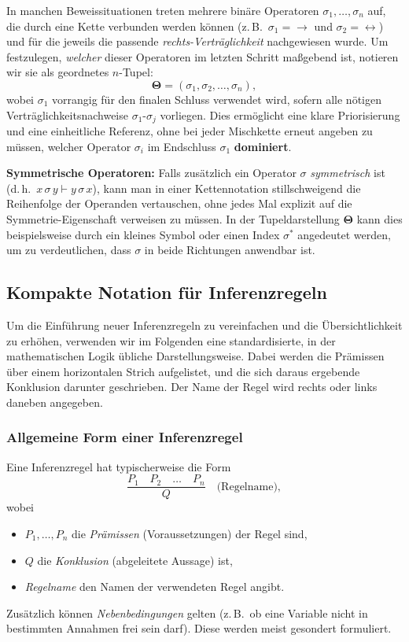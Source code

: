 \documentclass[main.tex]{subfiles}
\begin{document}
\begin{remark}
In manchen Beweissituationen treten mehrere binäre Operatoren \(\sigma_1, \dots, \sigma_n\) auf, die durch eine Kette verbunden werden können (z.\,B.\ \(\sigma_1 = \to\) und \(\sigma_2 = \leftrightarrow\)) und für die jeweils die passende \emph{rechts-Verträglichkeit} nachgewiesen wurde. Um festzulegen, \emph{welcher} dieser Operatoren im letzten Schritt maßgebend ist, notieren wir sie als geordnetes \(n\)-Tupel:
\[
\boldsymbol{\Theta} = (\sigma_1, \sigma_2, \ldots, \sigma_n),
\]
wobei \(\sigma_1\) vorrangig für den finalen Schluss verwendet wird, sofern alle nötigen Verträglichkeitsnachweise \(\sigma_1\)-\(\sigma_j\) vorliegen. Dies ermöglicht eine klare Priorisierung und eine einheitliche Referenz, ohne bei jeder Mischkette erneut angeben zu müssen, welcher Operator \(\sigma_i\) im Endschluss \(\sigma_1\) \textbf{dominiert}.

\smallskip

\textbf{Symmetrische Operatoren:} Falls zusätzlich ein Operator \(\sigma\) \emph{symmetrisch} ist (d.\,h.\ \(x \,\sigma\, y \vdash y \,\sigma\, x\)), kann man in einer Kettennotation stillschweigend die Reihenfolge der Operanden vertauschen, ohne jedes Mal explizit auf die Symmetrie-Eigenschaft verweisen zu müssen. In der Tupeldarstellung \(\boldsymbol{\Theta}\) kann dies beispielsweise durch ein kleines Symbol oder einen Index \(\sigma^*\) angedeutet werden, um zu verdeutlichen, dass \(\sigma\) in beide Richtungen anwendbar ist.
\end{remark}

\subsection{Kompakte Notation für Inferenzregeln}

Um die Einführung neuer Inferenzregeln zu vereinfachen und die Übersichtlichkeit zu erhöhen, verwenden wir im Folgenden eine standardisierte, in der mathematischen Logik übliche Darstellungsweise. Dabei werden die Prämissen über einem horizontalen Strich aufgelistet, und die sich daraus ergebende Konklusion darunter geschrieben. Der Name der Regel wird rechts oder links daneben angegeben. 

\subsubsection{Allgemeine Form einer Inferenzregel}
Eine Inferenzregel hat typischerweise die Form
\[
\frac{P_1 \quad P_2 \quad \dots \quad P_n}{Q}
\quad
\text{(Regelname)},
\]
wobei
\begin{itemize}
    \item $P_1, \dots, P_n$ die \emph{Prämissen} (Voraussetzungen) der Regel sind,
    \item $Q$ die \emph{Konklusion} (abgeleitete Aussage) ist,
    \item \textit{Regelname} den Namen der verwendeten Regel angibt.
\end{itemize}
Zusätzlich können \emph{Nebenbedingungen} gelten (z.\,B.\ ob eine Variable nicht in bestimmten Annahmen frei sein darf). Diese werden meist gesondert formuliert.
\end{document}
